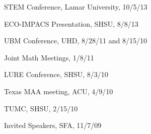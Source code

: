 \documentclass[letterpaper]{deedy-resume} %
\begin{document}
 \vspace{\topsep}
\begin{tightitemize}
   \item {STEM Conference, Lamar University, 10/5/13}
   \item {ECO-IMPACS Presentation, SHSU, 8/8/13}
\end{tightitemize}
\vspace{\topsep}
 \vspace{\topsep}
\begin{tightitemize}
	 \item {UBM Conference, UHD, 8/28/11 and 8/15/10}
	 \item {Joint Math Meetings, 1/8/11}
	 \item {LURE Conference, SHSU, 8/3/10}
	 \item {Texas MAA meeting, ACU, 4/9/10}
\end{tightitemize}
\vspace{\topsep}
 \vspace{\topsep}
\begin{tightitemize}
   \item {TUMC, SHSU, 2/15/10}
   \item {Invited Speakers, SFA, 11/7/09}
\end{tightitemize}
\end{document}

